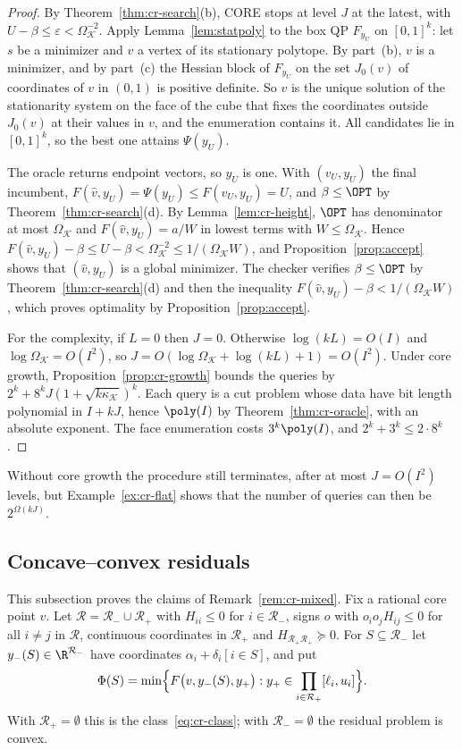 \begin{proof}
By Theorem~\ref{thm:cr-search}(b), CORE stops at level $J$ at the latest,
with $U-\beta\le\varepsilon<\Omega_{\mathcal K}^{-2}$. Apply
Lemma~\ref{lem:statpoly} to the box QP $F_{y_U}$ on $[0,1]^k$: let $s$ be a
minimizer and $v$ a vertex of its stationary polytope. By part~(b), $v$ is a
minimizer, and by part~(c) the Hessian block of $F_{y_U}$ on the set
$J_0(v)$ of coordinates of $v$ in $(0,1)$ is positive definite. So $v$ is the unique solution of the stationarity
system on the face of the cube that fixes the coordinates outside $J_0(v)$
at their values in $v$, and the enumeration contains it. All candidates lie
in $[0,1]^k$, so the best one attains $\Psi(y_U)$.

The oracle returns endpoint vectors, so $y_U$ is one. With $(v_U,y_U)$ the
final incumbent, $F(\hat v,y_U)=\Psi(y_U)\le F(v_U,y_U)=U$, and
$\beta\le\OPT$ by Theorem~\ref{thm:cr-search}(d). By
Lemma~\ref{lem:cr-height}, $\OPT$ has denominator at most
$\Omega_{\mathcal K}$ and $F(\hat v,y_U)=a/W$ in lowest terms with
$W\le\Omega_{\mathcal K}$. Hence
$F(\hat v,y_U)-\beta\le U-\beta<\Omega_{\mathcal K}^{-2}\le
1/(\Omega_{\mathcal K}W)$, and Proposition~\ref{prop:accept} shows that
$(\hat v,y_U)$ is a global minimizer. The checker verifies
$\beta\le\OPT$ by Theorem~\ref{thm:cr-search}(d) and then the inequality
$F(\hat v,y_U)-\beta<1/(\Omega_{\mathcal K}W)$, which proves optimality by
Proposition~\ref{prop:accept}.

For the complexity, if $L=0$ then $J=0$. Otherwise
$\log(kL)=O(I)$ and $\log\Omega_{\mathcal K}=O(I^2)$, so
$J=O(\log\Omega_{\mathcal K}+\log(kL)+1)=O(I^2)$.
Under core growth, Proposition~\ref{prop:cr-growth} bounds the queries by
$2^k+8^kJ(1+\sqrt{k\kappa_{\mathcal K}})^k$. Each query is a cut problem
whose data have bit length polynomial in $I+kJ$, hence $\poly(I)$ by
Theorem~\ref{thm:cr-oracle}, with an absolute exponent. The face
enumeration costs $3^k\poly(I)$, and $2^k+3^k\le2\cdot8^k$.
\end{proof}

Without core growth the procedure still terminates, after at most
$J=O(I^2)$ levels, but Example~\ref{ex:cr-flat} shows that the number of
queries can then be $2^{\Omega(kJ)}$.

\subsection{Concave--convex residuals}

This subsection proves the claims of Remark~\ref{rem:cr-mixed}. Fix a
rational core point $v$. Let $\mathcal R=\mathcal R_-\cup\mathcal R_+$ with
$H_{ii}\le0$ for $i\in\mathcal R_-$, signs $o$ with $o_io_jH_{ij}\le0$ for
all $i\ne j$ in $\mathcal R$, continuous coordinates in $\mathcal R_+$ and
$H_{\mathcal R_+\mathcal R_+}\succeq0$. For $S\subseteq\mathcal R_-$
let $y_-(S)\in\R^{\mathcal R_-}$ have coordinates
$\alpha_i+\delta_i[i\in S]$, and put
\[
\Phi(S)=\min\Bigl\{F\bigl(v,y_-(S),y_+\bigr):
y_+\in\prod_{i\in\mathcal R_+}[\ell_i,u_i]\Bigr\}.
\]
With $\mathcal R_+=\emptyset$ this is the class~\eqref{eq:cr-class}; with
$\mathcal R_-=\emptyset$ the residual problem is convex.

